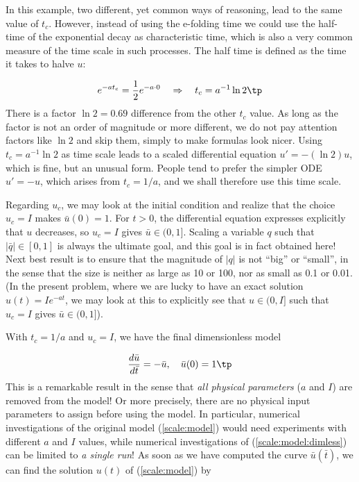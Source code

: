\documentclass[graybox,envcountchap,sectrefs,final]{svmonodo}
\begin{document}
In this example, two different, yet common ways of reasoning, lead to the
same value of $t_c$. However, instead of using the e-folding time we
could use the half-time of the exponential decay as characteristic
time, which is also a very common measure of the time scale in such
processes. The half time is defined as the time it takes to halve $u$:

\[ e^{-at_c} = \frac{1}{2}e^{-a\cdot 0}
\quad\Rightarrow\quad t_c = a^{-1}\ln 2\tp\]
There is a factor $\ln 2 =0.69$ difference from the other $t_c$ value.
As long as the factor is not an order of magnitude or more different,
we do not pay attention factors like $\ln 2$ and skip them, simply to make
formulas look nicer. Using
$t_c = a^{-1}\ln 2$ as time scale
leads to a scaled differential equation $u'=-(\ln 2) u$,
which is fine, but an unusual form. People tend to prefer the simpler
ODE $u'=-u$,
which arises from $t_c=1/a$, and we shall therefore use this
time scale.

Regarding $u_c$, we may look at the initial condition and realize that
the choice $u_c=I$ makes $\bar u(0)=1$. For $t>0$, the differential
equation expresses explicitly that $u$ decreases, so $u_c=I$ gives
$\bar u\in (0, 1]$. Scaling a variable $q$ such that $|\bar q|\in
[0,1]$ is always the ultimate goal, and this goal is in fact obtained
here! Next best result is to ensure that the magnitude of $|q|$ is not
``big'' or ``small'', in the sense that the size is neither as large as
10 or 100, nor as small as
0.1 or 0.01.  (In the
present problem, where we are lucky to have an exact solution
$u(t)=Ie^{-at}$, we may look at this to explicitly see that $u\in
(0,I]$ such that $u_c=I$ gives $\bar u\in (0,1]$).

With $t_c=1/a$ and $u_c=I$, we have the final dimensionless model

\begin{equation}
\frac{d\bar u}{d\bar t} = -\bar u,\quad \bar u(0)=1
\tp
\label{scale:model:dimless}
\end{equation}
This is a remarkable result in the sense that \emph{all physical parameters}
($a$ and $I$)
are removed from the model! Or more precisely, there are no physical input
parameters to assign
before using the model. In particular, numerical investigations of the original
model (\ref{scale:model}) would need experiments with different
$a$ and $I$ values, while numerical investigations of
(\ref{scale:model:dimless}) can be limited to \emph{a single run}! As soon
as we have computed the curve $\bar u(\bar t)$, we can find the
solution $u(t)$ of (\ref{scale:model}) by
\end{document}
